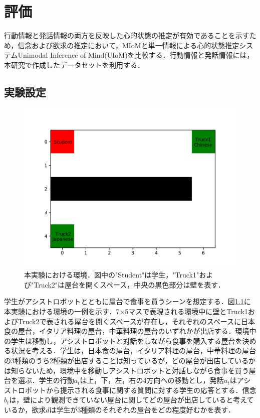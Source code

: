 \chapter{評価}
\par
行動情報と発話情報の両方を反映した心的状態の推定が有効であることを示すため，信念および欲求の推定において，MIoMと単一情報による心的状態推定システムUnimodal Inference of Mind(UIoM)を比較する．行動情報と発話情報には，本研究で作成したデータセットを利用する．

\section{実験設定}

\begin{figure}[htbp]
  \begin{center}
    \includegraphics[]{./figure.pdf}
    \caption{本実験における環境．図中の"Student"は学生，"Truck1"および"Truck2"は屋台を開くスペース，中央の黒色部分は壁を表す．}
    \label{fig:ex_env}
  \end{center}
\end{figure}

\par
学生がアシストロボットとともに屋台で食事を買うシーンを想定する．図\ref{fig:ex_env}に本実験における環境の一例を示す．7$\times$5マスで表現される環境中に壁とTruck1およびTruck2で表される屋台を開くスペースが存在し，それぞれのスペースに日本食の屋台，イタリア料理の屋台，中華料理の屋台のいずれかが出店する．環境中の学生は移動し，アシストロボットと対話をしながら食事を購入する屋台を決める状況を考える．学生は，日本食の屋台，イタリア料理の屋台，中華料理の屋台の3種類のうち2種類が出店することは知っているが，どの屋台が出店しているかは知らないため，環境中を移動しアシストロボットと対話しながら食事を買う屋台を選ぶ．学生の行動$a_t$は上，下，左，右の4方向への移動とし，発話$u_t$はアシストロボットから提示される食事に関する質問に対する学生の応答とする．信念$b_t$は，壁により観測できていない屋台に関してどの屋台が出店していると考えているか，欲求$d$は学生が3種類のそれぞれの屋台をどの程度好むかを表す．




